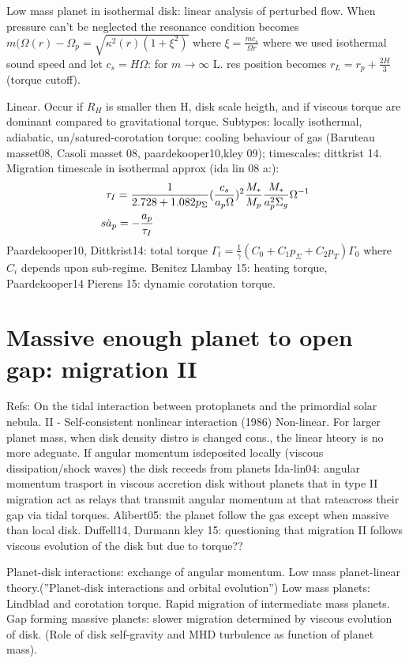 \begin{workout}
Low mass planet in isothermal disk: linear analysis of perturbed flow.
When pressure can't be neglected the resonance condition becomes $m(\Omega(r)-\Omega_p=\sqrt{\kappa^2(r)(1+\xi^2)}$ where $\xi=\frac{mc_s}{\Omega r}$ where we used isothermal sound speed and let $c_s=H\Omega$: for $m\to\infty$ L. res position becomes $r_L=r_p+\frac{2H}{3}$ (torque cutoff).

Linear. Occur if $R_H$ is smaller then H, disk scale heigth, and if viscous torque are dominant compared to gravitational torque.
Subtypes: locally isothermal, adiabatic, un/satured-corotation torque: cooling behaviour of gas (Baruteau masset08, Casoli masset 08, paardekooper10,kley 09); timescales: dittkrist 14.
Migration timescale in isothermal approx (ida lin 08 a:):
\begin{align*}
&\tau_I=\frac{1}{2.728+1.082p_{\Sigma}}(\frac{c_s}{a_p\Omega})^2\frac{M_*}{M_p}\frac{M_*}{a_p^2\Sigma_g}\Omega^{-1}\\
s&\dot{a}_p=-\frac{a_p}{\tau_I}
\end{align*}
Paardekooper10, Dittkrist14: total torque $\Gamma_t=\frac{1}{\gamma}(C_0+C_1p_{\Sigma}+C_2p_T)\Gamma_0$ where $C_i$ depends upon sub-regime.
Benitez Llambay 15: heating torque, Paardekooper14 Pierens 15: dynamic corotation torque.
\end{workout}

\section{Massive enough planet to open gap: migration II}

Refs: On the tidal interaction between protoplanets and the primordial solar nebula. II - Self-consistent nonlinear interaction (1986)
Non-linear. For larger planet mass, when disk density distro is changed cons., the linear hteory is no more adeguate. If angular momentum isdeposited locally (viscous dissipation/shock waves)  the disk receeds from planets
Ida-lin04: angular momentum trasport in viscous accretion disk without planets that in type II migration act as relays that transmit angular momentum at that rateacross their gap via tidal torques.
Alibert05: the planet follow the gas except when massive than local disk.
Duffell14, Durmann kley 15: questioning that migration II follows viscous evolution of the disk but due to torque??


Planet-disk interactions: exchange of angular momentum. Low mass planet-linear theory.(''Planet-disk interactions and orbital evolution'')
Low mass planets: Lindblad and corotation torque. Rapid migration of intermediate mass planets. Gap forming massive planets: slower migration determined by viscous evolution of disk. (Role of disk self-gravity and MHD turbulence as function of planet mass).


